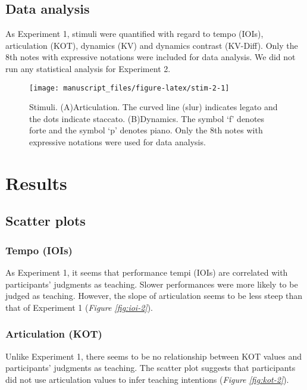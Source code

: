 \documentclass[
  man,floatsintext]{apa6}
\begin{document}
\hypertarget{dataanalysis2}{%
\subsection{Data analysis}\label{dataanalysis2}}

As Experiment 1, stimuli were quantified with regard to tempo (IOIs), articulation (KOT), dynamics (KV) and dynamics contrast (KV-Diff). Only the 8th notes with expressive notations were included for data analysis. We did not run any statistical analysis for Experiment 2.

\begin{figure}
\texttt{[image: manuscript\_files/figure-latex/stim-2-1]} \caption{\label{fig:stim2}Stimuli. (A)Articulation. The curved line (slur) indicates legato and the dots indicate staccato. (B)Dynamics. The symbol `f' denotes forte and the symbol `p' denotes piano. Only the 8th notes with expressive notations were used for data analysis.}\label{fig:stim-2}
\end{figure}

\hypertarget{results-1}{%
\section{Results}\label{results-1}}

\hypertarget{scatter-plots}{%
\subsection{Scatter plots}\label{scatter-plots}}

\hypertarget{tempo-iois-1}{%
\subsubsection{Tempo (IOIs)}\label{tempo-iois-1}}

As Experiment 1, it seems that performance tempi (IOIs) are correlated with participants' judgments as teaching. Slower performances were more likely to be judged as teaching. However, the slope of articulation seems to be less steep than that of Experiment 1 (\emph{Figure \ref{fig:ioi-2}}).

\hypertarget{articulation-kot-1}{%
\subsubsection{Articulation (KOT)}\label{articulation-kot-1}}

Unlike Experiment 1, there seems to be no relationship between KOT values and participants' judgments as teaching. The scatter plot suggests that participants did not use articulation values to infer teaching intentions (\emph{Figure \ref{fig:kot-2}}).
\end{document}
